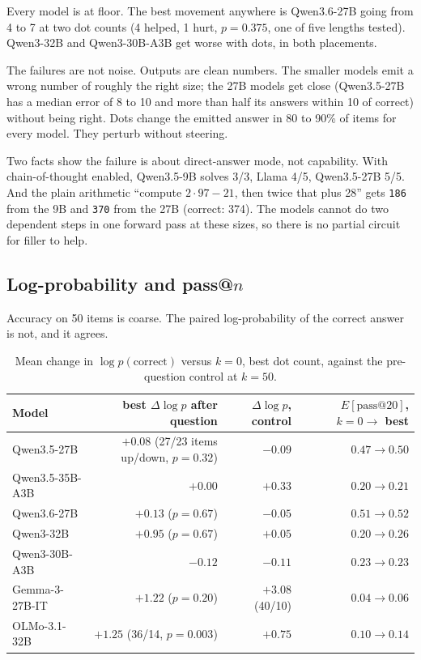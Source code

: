 \documentclass[11pt]{article}
\newcommand{\ttt}[1]{\texttt{\small #1}}
\begin{document}
Every model is at floor. The best movement anywhere is Qwen3.6-27B going from 4 to 7 at two dot counts (4 helped, 1 hurt, $p = 0.375$, one of five lengths tested). Qwen3-32B and Qwen3-30B-A3B get worse with dots, in both placements.

The failures are not noise. Outputs are clean numbers. The smaller models emit a wrong number of roughly the right size; the 27B models get close (Qwen3.5-27B has a median error of 8 to 10 and more than half its answers within 10 of correct) without being right. Dots change the emitted answer in 80 to 90\% of items for every model. They perturb without steering.

Two facts show the failure is about direct-answer mode, not capability. With chain-of-thought enabled, Qwen3.5-9B solves 3/3, Llama 4/5, Qwen3.5-27B 5/5. And the plain arithmetic ``compute $2 \cdot 97 - 21$, then twice that plus 28'' gets \ttt{186} from the 9B and \ttt{370} from the 27B (correct: 374). The models cannot do two dependent steps in one forward pass at these sizes, so there is no partial circuit for filler to help.

\subsection{Log-probability and pass@$n$}

Accuracy on 50 items is coarse. The paired log-probability of the correct answer is not, and it agrees.

\begin{table}[h]\centering\footnotesize
\begin{tabular}{lrrr}\toprule
Model & best $\Delta \log p$ after question & $\Delta \log p$, control & $E[\text{pass@20}]$, $k=0 \to$ best \\ \midrule
Qwen3.5-27B & $+0.08$ (27/23 items up/down, $p=0.32$) & $-0.09$ & $0.47 \to 0.50$ \\
Qwen3.5-35B-A3B & $+0.00$ & $+0.33$ & $0.20 \to 0.21$ \\
Qwen3.6-27B & $+0.13$ ($p=0.67$) & $-0.05$ & $0.51 \to 0.52$ \\
Qwen3-32B & $+0.95$ ($p=0.67$) & $+0.05$ & $0.20 \to 0.26$ \\
Qwen3-30B-A3B & $-0.12$ & $-0.11$ & $0.23 \to 0.23$ \\
Gemma-3-27B-IT & $+1.22$ ($p=0.20$) & $+3.08$ (40/10) & $0.04 \to 0.06$ \\
OLMo-3.1-32B & $+1.25$ (36/14, $p=0.003$) & $+0.75$ & $0.10 \to 0.14$ \\ \bottomrule
\end{tabular}
\caption{Mean change in $\log p(\text{correct})$ versus $k=0$, best dot count, against the pre-question control at $k=50$.}\end{table}
\end{document}

